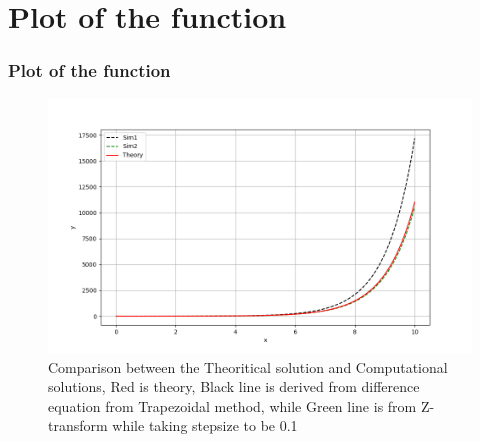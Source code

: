\documentclass{beamer}
\theoremstyle{remark}
\numberwithin{equation}{section}
\begin{document}
\section{Plot of the function}
\begin{frame}
\frametitle{Plot of the function}
\begin{figure}[H]
    \centering
	\includegraphics[width=0.8\columnwidth]{figs/fig.png}
    \caption{Comparison between the Theoritical solution and Computational solutions, Red is theory, Black line is derived from difference equation from Trapezoidal method, while Green line is from Z-transform while taking stepsize to be 0.1}
    \end{figure}   
\end{frame}
\end{document}
